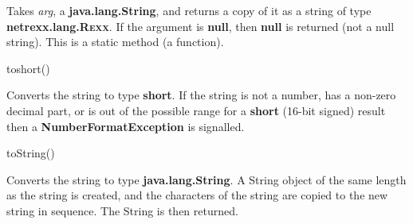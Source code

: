 \begin{description}
 
Takes \emph{arg}, a \textbf{java.lang.String}, and returns a copy
of it as a string of type \textbf{netrexx.lang.R\textsc{exx}}.
If the argument is \textbf{null}, then \textbf{null} is returned
(not a null string).
This is a static method (a function).
\item{toshort()}

Converts the string to type \textbf{short}.  If the string is
not a number, has a non-zero decimal part, or is out of the possible
range for a \textbf{short} (16-bit signed) result then
a \textbf{NumberFormatException} is signalled.
\item{toString()}

Converts the string to type \textbf{java.lang.String}.  A String
object of the same length as the string is created, and the characters
of the string are copied to the new string in sequence.  The String is
then returned.
\end{description}
